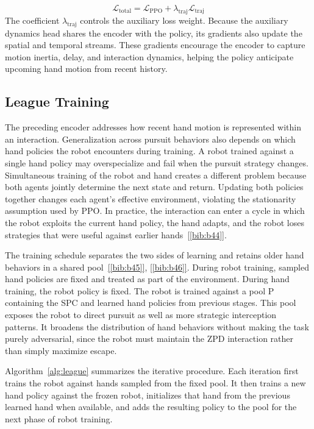 \documentclass[journal,twoside,web]{ieeecolor2}
\newcommand{\citelink}[1]{\hyperref[bib:#1]{[\ref*{bib:#1}]}}
\begin{document}
\begin{equation}
\mathcal{L}_{\mathrm{total}} = \mathcal{L}_{\mathrm{PPO}} + \lambda_{\mathrm{traj}}\mathcal{L}_{\mathrm{traj}}
\label{eq:total_loss}
\end{equation}
The coefficient $\lambda_{\mathrm{traj}}$ controls the auxiliary loss weight. Because the auxiliary dynamics head shares the encoder with the policy, its gradients also update the spatial and temporal streams. These gradients encourage the encoder to capture motion inertia, delay, and interaction dynamics, helping the policy anticipate upcoming hand motion from recent history.

\subsection{League Training}
The preceding encoder addresses how recent hand motion is represented within an interaction. Generalization across pursuit behaviors also depends on which hand policies the robot encounters during training. A robot trained against a single hand policy may overspecialize and fail when the pursuit strategy changes. Simultaneous training of the robot and hand creates a different problem because both agents jointly determine the next state and return. Updating both policies together changes each agent's effective environment, violating the stationarity assumption used by PPO. In practice, the interaction can enter a cycle in which the robot exploits the current hand policy, the hand adapts, and the robot loses strategies that were useful against earlier hands~\citelink{b44}.

The training schedule separates the two sides of learning and retains older hand behaviors in a shared pool~\citelink{b45}, \citelink{b46}. During robot training, sampled hand policies are fixed and treated as part of the environment. During hand training, the robot policy is fixed. The robot is trained against a pool P containing the SPC and learned hand policies from previous stages. This pool exposes the robot to direct pursuit as well as more strategic interception patterns. It broadens the distribution of hand behaviors without making the task purely adversarial, since the robot must maintain the ZPD interaction rather than simply maximize escape.

Algorithm~\ref{alg:league} summarizes the iterative procedure. Each iteration first trains the robot against hands sampled from the fixed pool. It then trains a new hand policy against the frozen robot, initializes that hand from the previous learned hand when available, and adds the resulting policy to the pool for the next phase of robot training.
\end{document}
